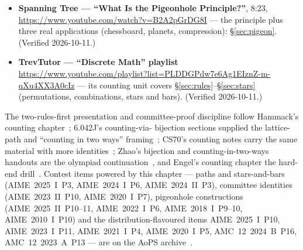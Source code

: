 \begin{rulebox}
\begin{itemize}
\item \textbf{Spanning Tree --- ``What Is the Pigeonhole Principle?''},
8:23, \url{https://www.youtube.com/watch?v=B2A2pGrDG8I} --- the
principle plus three real applications (chessboard, planets, compression):
\S\ref{sec:pigeon}. (Verified 2026-10-11.)
\item \textbf{TrevTutor --- ``Discrete Math'' playlist}
\url{https://www.youtube.com/playlist?list=PLDDGPdw7e6Ag1EIznZ-m-qXu4XX3A0cIz}
--- its counting unit covers \S\ref{sec:rules}--\S\ref{sec:stars}
(permutations, combinations, stars and bars). (Verified 2026-10-11.)
\end{itemize}
\end{rulebox}

\chapternotes
The two-rules-first presentation and committee-proof discipline follow
Hammack's counting chapter~\cite{hammack}; 6.042J's counting-via-
bijection sections supplied the lattice-path and ``counting in two
ways'' framing~\cite{mcs}; CS70's counting notes carry the same
material with more identities~\cite{cs70}; Zhao's bijection and
counting-in-two-ways handouts are the olympiad continuation~\cite{zhao},
and Engel's counting chapter the hard-end drill~\cite{engel}. Contest
items powered by this chapter --- paths and stars-and-bars (AIME~2025~I~P3,
AIME~2024~I~P6, AIME~2024~II~P3), committee identities (AIME~2023~II~P10,
AIME~2020~I~P7), pigeonhole constructions (AIME~2025~II~P10--11,
AIME~2022~I~P6, AIME~2018~I~P9--10, AIME~2010~I~P10) and the
distribution-flavoured items AIME~2025~I~P10, AIME~2023~I~P11,
AIME~2021~I~P4, AIME~2020~I~P5, AMC~12~2024~B~P16, AMC~12~2023~A~P13 ---
are on the AoPS archive~\cite{aops-amc}.
